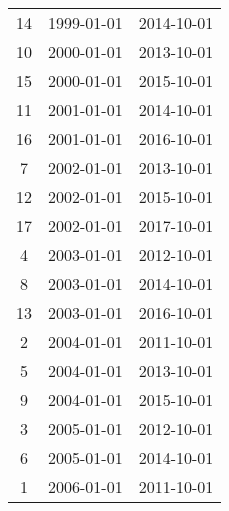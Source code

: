 % 
\begin{tabular}{ccc}
  \hline
  \hline
14 & 1999-01-01 & 2014-10-01 \\ 
  10 & 2000-01-01 & 2013-10-01 \\ 
  15 & 2000-01-01 & 2015-10-01 \\ 
  11 & 2001-01-01 & 2014-10-01 \\ 
  16 & 2001-01-01 & 2016-10-01 \\ 
  7 & 2002-01-01 & 2013-10-01 \\ 
  12 & 2002-01-01 & 2015-10-01 \\ 
  17 & 2002-01-01 & 2017-10-01 \\ 
  4 & 2003-01-01 & 2012-10-01 \\ 
  8 & 2003-01-01 & 2014-10-01 \\ 
  13 & 2003-01-01 & 2016-10-01 \\ 
  2 & 2004-01-01 & 2011-10-01 \\ 
  5 & 2004-01-01 & 2013-10-01 \\ 
  9 & 2004-01-01 & 2015-10-01 \\ 
  3 & 2005-01-01 & 2012-10-01 \\ 
  6 & 2005-01-01 & 2014-10-01 \\ 
  1 & 2006-01-01 & 2011-10-01 \\ 
   \hline
\end{tabular}
